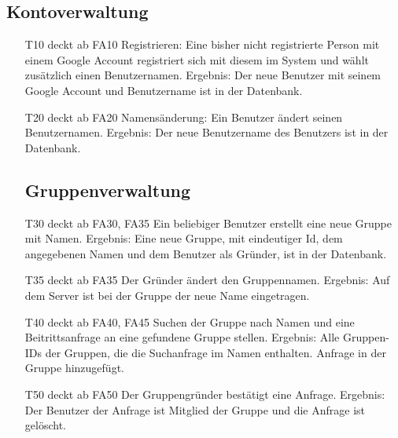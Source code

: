 \documentclass{scrartcl}
\begin{document}
	\subsection{Kontoverwaltung}
	\begin{itemize} 
		\item[T10] deckt ab FA10 \newline
		Registrieren: Eine bisher nicht registrierte Person mit einem Google Account registriert sich mit diesem im System 				und wählt zusätzlich einen Benutzernamen. \newline
		Ergebnis: Der neue Benutzer mit seinem Google Account und Benutzername ist in der Datenbank.

		\item[T20] deckt ab FA20\newline
		Namensänderung: Ein Benutzer ändert seinen Benutzernamen. \newline
		Ergebnis: Der neue Benutzername des Benutzers ist in der Datenbank. 
	
	\subsection{Gruppenverwaltung}
	
		\item[T30] deckt ab FA30, FA35\newline
		 Ein beliebiger Benutzer erstellt eine neue Gruppe mit Namen. \newline
		Ergebnis: Eine neue Gruppe, mit eindeutiger Id, dem angegebenen Namen und dem Benutzer als Gründer, ist in der 			Datenbank.

		\item[T35] deckt ab FA35 \newline
		Der Gründer ändert den Gruppennamen.\newline
		Ergebnis: Auf dem Server ist bei der Gruppe der neue Name eingetragen. 

		\item[T40] deckt ab FA40, FA45  \newline
		Suchen der Gruppe nach Namen und eine Beitrittsanfrage an eine gefundene Gruppe stellen. \newline
		Ergebnis: Alle Gruppen-IDs der Gruppen, die die Suchanfrage im Namen enthalten. Anfrage in der Gruppe 		
		hinzugefügt.

		\item[T50] deckt ab FA50  \newline
		Der Gruppengründer bestätigt eine Anfrage. \newline
		Ergebnis: Der Benutzer der Anfrage ist \gls{Mitglied} der Gruppe und die Anfrage ist gelöscht.


\end{itemize}
\end{document}
